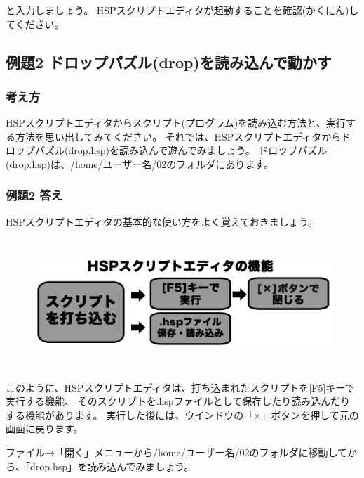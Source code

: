 \noindent
と入力しましょう。
HSPスクリプトエディタが起動することを確認(かくにん)してください。
\clearpage

% 
% 
% 
\subsection{例題2 ドロップパズル(drop)を読み込んで動かす}

\subsubsection*{考え方}

HSPスクリプトエディタからスクリプト(プログラム)を読み込む方法と、実行する方法を思い出してみてください。
それでは、HSPスクリプトエディタからドロップパズル(drop.hsp)を読み込んで遊んでみましょう。
ドロップパズル(drop.hsp)は、/home/ユーザー名/02のフォルダにあります。

\subsubsection*{例題2 答え}

HSPスクリプトエディタの基本的な使い方をよく覚えておきましょう。

\begin{figure}[H]
  \begin{center}
    \includegraphics[keepaspectratio,width=15.533cm,height=4.86cm]{images/chap02/text02-img013.png}
  \end{center}
  \label{fig:hsed_chart}
\end{figure}

\noindent
このように、HSPスクリプトエディタは、打ち込まれたスクリプトを[F5]キーで実行する機能、
そのスクリプトを.hspファイルとして保存したり読み込んだりする機能があります。
実行した後には、ウインドウの「×」ボタンを押して元の画面に戻ります。

ファイル→「開く」メニューから/home/ユーザー名/02のフォルダに移動してから、「drop.hsp」を読み込んでみましょう。

